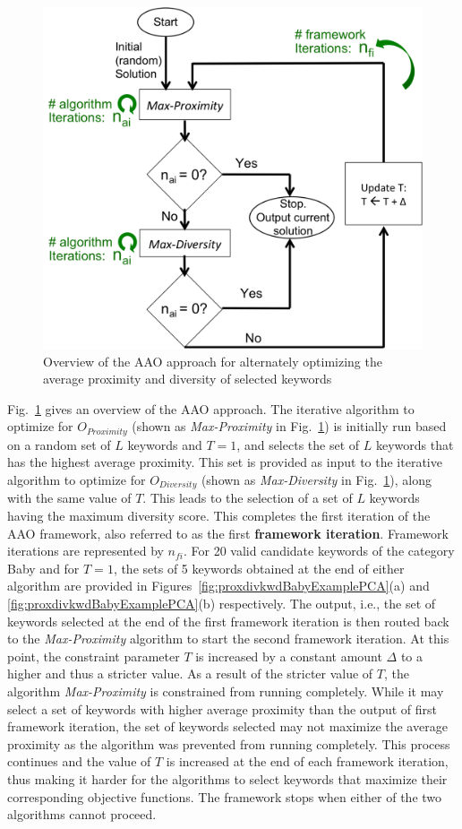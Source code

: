 \begin{figure}
\centering
\includegraphics[width=0.75\linewidth]{TrainingData/figs/aao_overview.png}
\caption{Overview of the AAO approach for alternately optimizing the average proximity and diversity of selected keywords}
\label{fig:AAOoverview}
\end{figure}

Fig.~\ref{fig:AAOoverview} gives an overview of the AAO approach. The iterative algorithm to optimize for $O_{Proximity}$ (shown as \textit{Max-Proximity} in Fig.~\ref{fig:AAOoverview}) is initially run based on a random set of $L$ keywords and $T=1$, and selects the set of $L$ keywords that has the highest average proximity. This set is provided as input to the iterative algorithm to optimize for $O_{Diversity}$ (shown as \textit{Max-Diversity} in Fig.~\ref{fig:AAOoverview}), along with the same value of $T$. This leads to the selection of a set of $L$ keywords having the maximum diversity score. This completes the first iteration of the AAO framework, also referred to as the first \textbf{framework iteration}. Framework iterations are represented by $n_{fi}$. For 20 valid candidate keywords of the category Baby and for $T=1$, the sets of 5 keywords obtained at the end of either algorithm are provided in Figures~\ref{fig:proxdivkwdBabyExamplePCA}(a) and \ref{fig:proxdivkwdBabyExamplePCA}(b) respectively. The output, i.e., the set of keywords selected at the end of the first framework iteration is then routed back to the \textit{Max-Proximity} algorithm to start the second framework iteration. At this point, the constraint parameter $T$ is increased by a constant amount $\Delta$ to a higher and thus a stricter value. As a result of the stricter value of $T$, the algorithm \textit{Max-Proximity} is constrained from running completely. While it may select a set of keywords with higher average proximity than the output of first framework iteration, the set of keywords selected may not maximize the average proximity as the algorithm was prevented from running completely. This process continues and the value of $T$ is increased at the end of each framework iteration, thus making it harder for the algorithms to select keywords that maximize their corresponding objective functions. The framework stops when either of the two algorithms cannot proceed. 

